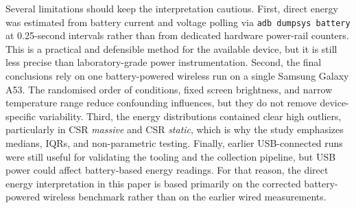 Several limitations should keep the interpretation cautious. First, direct energy was estimated from battery current and voltage polling via \texttt{adb dumpsys battery} at 0.25-second intervals rather than from dedicated hardware power-rail counters. This is a practical and defensible method for the available device, but it is still less precise than laboratory-grade power instrumentation. Second, the final conclusions rely on one battery-powered wireless run on a single Samsung Galaxy A53. The randomised order of conditions, fixed screen brightness, and narrow temperature range reduce confounding influences, but they do not remove device-specific variability. Third, the energy distributions contained clear high outliers, particularly in CSR \textit{massive} and CSR \textit{static}, which is why the study emphasizes medians, IQRs, and non-parametric testing. Finally, earlier USB-connected runs were still useful for validating the tooling and the collection pipeline, but USB power could affect battery-based energy readings. For that reason, the direct energy interpretation in this paper is based primarily on the corrected battery-powered wireless benchmark rather than on the earlier wired measurements.
